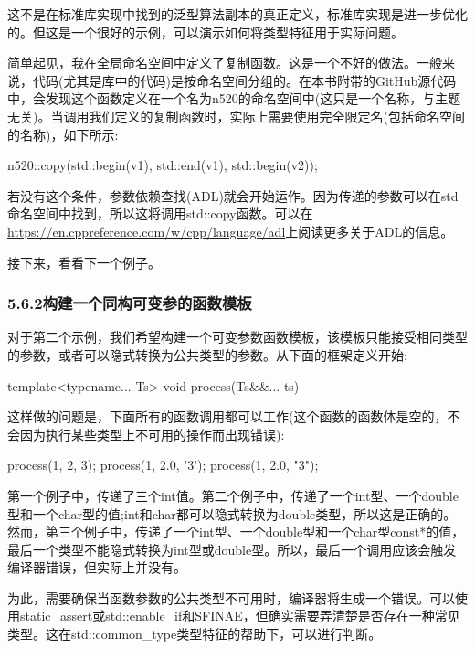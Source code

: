 这不是在标准库实现中找到的泛型算法副本的真正定义，标准库实现是进一步优化的。但这是一个很好的示例，可以演示如何将类型特征用于实际问题。

简单起见，我在全局命名空间中定义了复制函数。这是一个不好的做法。一般来说，代码(尤其是库中的代码)是按命名空间分组的。在本书附带的GitHub源代码中，会发现这个函数定义在一个名为n520的命名空间中(这只是一个名称，与主题无关)。当调用我们定义的复制函数时，实际上需要使用完全限定名(包括命名空间的名称)，如下所示:

\begin{cpp}
n520::copy(std::begin(v1), std::end(v1), std::begin(v2));
\end{cpp}

若没有这个条件，参数依赖查找(ADL)就会开始运作。因为传递的参数可以在std命名空间中找到，所以这将调用std::copy函数。可以在\url{https://en.cppreference.com/w/cpp/language/adl}上阅读更多关于ADL的信息。

接下来，看看下一个例子。

\subsubsection{5.6.2\hspace{0.2cm}构建一个同构可变参的函数模板}

对于第二个示例，我们希望构建一个可变参数函数模板，该模板只能接受相同类型的参数，或者可以隐式转换为公共类型的参数。从下面的框架定义开始:

\begin{cpp}
template<typename... Ts>
void process(Ts&&... ts) {}
\end{cpp}

这样做的问题是，下面所有的函数调用都可以工作(这个函数的函数体是空的，不会因为执行某些类型上不可用的操作而出现错误):

\begin{cpp}
process(1, 2, 3);
process(1, 2.0, '3');
process(1, 2.0, "3");
\end{cpp}

第一个例子中，传递了三个int值。第二个例子中，传递了一个int型、一个double型和一个char型的值;int和char都可以隐式转换为double类型，所以这是正确的。然而，第三个例子中，传递了一个int型、一个double型和一个char型const*的值，最后一个类型不能隐式转换为int型或double型。所以，最后一个调用应该会触发编译器错误，但实际上并没有。

为此，需要确保当函数参数的公共类型不可用时，编译器将生成一个错误。可以使用static\_assert或std::enable\_if和SFINAE，但确实需要弄清楚是否存在一种常见类型。这在std::common\_type类型特征的帮助下，可以进行判断。

